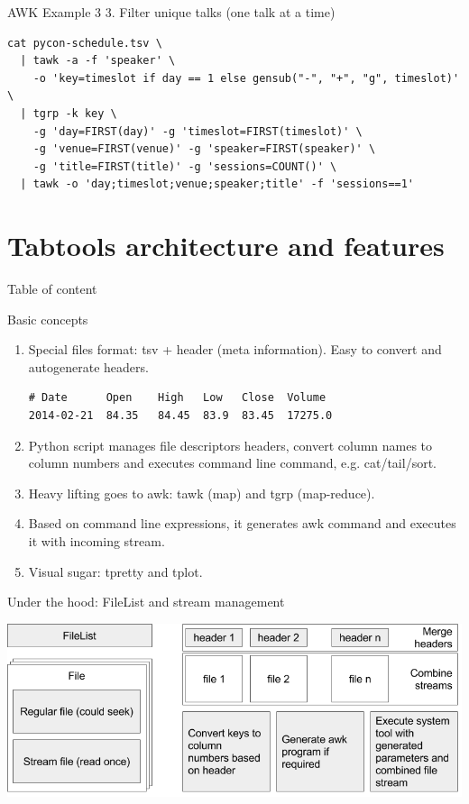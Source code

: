 \documentclass[unicode, notheorems, aspectratio=169]{beamer}
\begin{document}
\begin{frame}[fragile]{AWK Example 3}
3. Filter unique talks (one talk at a time)
\begin{verbatim}
cat pycon-schedule.tsv \
  | tawk -a -f 'speaker' \
    -o 'key=timeslot if day == 1 else gensub("-", "+", "g", timeslot)' \
  | tgrp -k key \
    -g 'day=FIRST(day)' -g 'timeslot=FIRST(timeslot)' \
    -g 'venue=FIRST(venue)' -g 'speaker=FIRST(speaker)' \
    -g 'title=FIRST(title)' -g 'sessions=COUNT()' \
  | tawk -o 'day;timeslot;venue;speaker;title' -f 'sessions==1'
\end{verbatim}
\end{frame}

\section{Tabtools architecture and features}
\begin{frame}{Table of content}
	\tableofcontents[currentsection]
\end{frame}

\begin{frame}[fragile]{Basic concepts}
\begin{enumerate}
\item Special files format: tsv + header (meta information). Easy to convert and autogenerate headers.
\begin{verbatim}
# Date      Open    High   Low   Close  Volume
2014-02-21  84.35   84.45  83.9  83.45  17275.0
\end{verbatim}
\item Python script manages file descriptors headers, convert column names to column numbers and executes command line command, e.g. cat/tail/sort.
\item Heavy lifting goes to awk: tawk (map) and tgrp (map-reduce).
\item Based on command line expressions, it generates awk command and executes it with incoming stream.
\item Visual sugar: tpretty and tplot.
\end{enumerate}
\end{frame}

\begin{frame}{Under the hood: FileList and stream management}
\begin{center}
	\includegraphics[width=\textwidth]{./images/file-list}
\end{center}
\end{frame}
\end{document}
